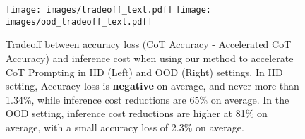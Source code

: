 \begin{figure}
    \centering
    \texttt{[image: images/tradeoff\_text.pdf]}
    \texttt{[image: images/ood\_tradeoff\_text.pdf]}
    \caption{Tradeoff between accuracy loss (CoT Accuracy - Accelerated CoT Accuracy) and inference cost when using our method to accelerate CoT Prompting in IID (Left) and OOD (Right) settings. In IID setting, Accuracy loss is \textbf{negative} on average, and never more than 1.34\%, while inference cost reductions are 65\% on average. In the OOD setting, inference cost reductions are higher at 81\% on average, with a small accuracy loss of 2.3\% on average.}
    \label{fig:tradeoff}
\end{figure}